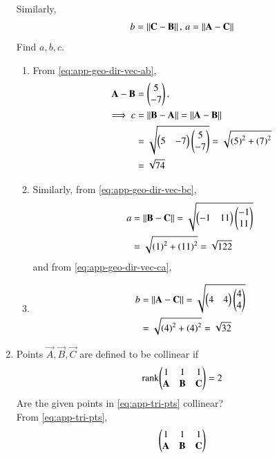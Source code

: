 \begin{enumerate}[label=\thesubsection.\arabic*.,ref=\thesubsection.\theenumi]
		Similarly, 
		\begin{align}
b = \left\lVert\mathbf{C}-\mathbf{B}\right\rVert,\,
a = \left\lVert\mathbf{A}-\mathbf{C}\right\rVert
		\end{align}
		Find $a, b, c$.
\begin{enumerate}
	\item 
	From 	
		\eqref{eq:app-geo-dir-vec-ab},
\begin{align}
\mathbf{A}-\mathbf{B} &= \begin{pmatrix}5\\-7\end{pmatrix}, \\
\implies 	c &= 	\left\lVert\mathbf{B}-\mathbf{A}\right\rVert = \left\lVert\mathbf{A}-\mathbf{B}\right\rVert 
	\\
	&= \sqrt{\begin{pmatrix}5 & -7\end{pmatrix}\begin{pmatrix}5\\-7\end{pmatrix}}
= \sqrt{\left(5\right)^2 +\left(7\right)^2}\\
	&=\sqrt{74}
		\label{eq:app-geo-norm-ab}
\end{align}
	\item Similarly, from 
		\eqref{eq:app-geo-dir-vec-bc},
\begin{align}
	a &= \left\lVert\mathbf{B}-\mathbf{C}\right\rVert 
	= \sqrt{\begin{pmatrix}-1 & 11\end{pmatrix}\begin{pmatrix}-1\\11\end{pmatrix}}
\\
&= \sqrt{\left(1\right)^2+\left(11\right)^2}
	= \sqrt{122}
		\label{eq:app-geo-norm-bc}
\end{align}
and
		from 		\eqref{eq:app-geo-dir-vec-ca},
	\item 
		\begin{align}
			b &= \left\lVert\mathbf{A}-\mathbf{C}\right\rVert = \sqrt{\begin{pmatrix}4 & 4\end{pmatrix}\begin{pmatrix}4\\4\end{pmatrix}}
\\
&= \sqrt{\left(4\right)^2+\left(4\right)^2}
	=\sqrt{32}
		\label{eq:app-geo-norm-ca}
\end{align}
\end{enumerate}
\item   Points $\vec{A}, \vec{B}, \vec{C}$ are defined to be collinear if 
		\begin{align}
			\label{eq:app-app-line-rank}
			\text{rank}{\ensuremath{\begin{pmatrix}1 & 1 & 1 \\ \mathbf{A}& \mathbf{B}&\mathbf{C}\end{pmatrix}}} = 2
		\end{align}
Are the given points in
			\eqref{eq:app-tri-pts}
collinear?
\\
\solution 
From 
			\eqref{eq:app-tri-pts},
\begin{align}
    \label{eq:app-1.1.3,2}
\begin{pmatrix}
    1 & 1 & 1\\
    \mathbf{A} & \mathbf{B} & \mathbf{C} \\
\end{pmatrix}
\end{align}
\end{enumerate}
